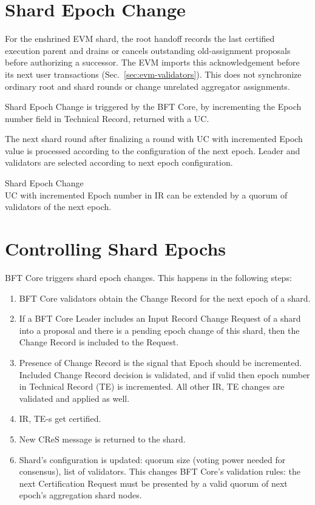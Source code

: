\section{Shard Epoch Change}

For the enshrined EVM shard, the root handoff records the last certified execution parent and drains or cancels outstanding old-assignment proposals before authorizing a successor. The EVM imports this acknowledgement before its next user transactions (Sec.~\ref{sec:evm-validators}). This does not synchronize ordinary root and shard rounds or change unrelated aggregator assignments.


Shard Epoch Change is triggered by the BFT Core, by incrementing the Epoch number field in Technical Record, returned with a UC.

The next shard round after finalizing a round with UC with incremented Epoch value is processed according to the configuration of the next epoch. Leader and validators are selected according to next epoch configuration.

\begin{ruledef*}{Shard Epoch Change} \\
  UC with incremented Epoch number in IR can be extended by a quorum of validators of the next epoch.
\end{ruledef*}

\section{Controlling Shard Epochs}

BFT Core triggers shard epoch changes. This happens in the following steps:

\begin{enumerate}
  \item BFT Core validators obtain the Change Record for the next epoch of a shard.
  \item If a BFT Core Leader includes an Input Record Change Request of a shard into a proposal and there is a pending epoch change of this shard, then the Change Record is included to the Request.
  \item Presence of Change Record is the signal that Epoch should be incremented. Included Change Record decision is validated, and if valid then epoch number in Technical Record (TE) is incremented. All other IR, TE changes are validated and applied as well.
  \item IR, TE-s get certified.
  \item New CReS message is returned to the shard.
  \item Shard's configuration is updated: quorum size (voting power needed for consensus), list of validators. This changes BFT Core's validation rules: the next Certification Request must be presented by a valid quorum of next epoch's aggregation shard nodes.
\end{enumerate}

